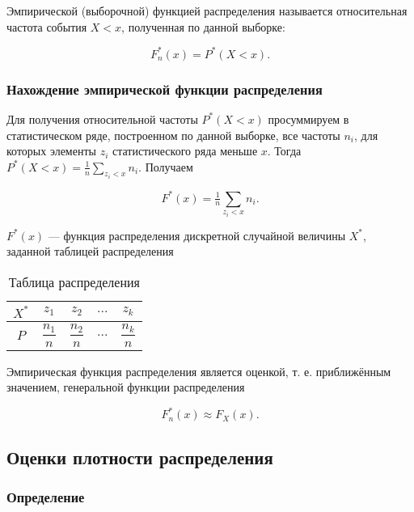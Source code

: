Эмпирической (выборочной) функцией распределения называется относительная частота события $X < x$, полученная по данной выборке:

\begin{equation}
	F_n^*(x) = P^*(X < x).
\end{equation}

\subsubsection{Нахождение эмпирической функции распределения}

Для получения относительной частоты $P^*(X < x)$ просуммируем в статистическом ряде, построенном по данной выборке, все частоты $n_i$, для которых элементы $z_i$ статистического ряда меньше $x$. Тогда $P^*(X < x) = \tfrac{1}{n}\sum\limits_{z_i < x}n_i$. Получаем

\begin{equation}
	F^*(x) = \tfrac{1}{n}\sum\limits_{z_i < x}n_i.
\end{equation}

$F^*(x)$ --- функция распределения дискретной случайной величины $X^*$, заданной таблицей распределения

\begin{table}[h!]
	\begin{center}
		\begin{tabular}{|c|c|c|c|c|}
			\hline
			$X^*$ & $z_1$ & $z_2$ & $...$ & $z_k$ \\
			\hline
			$P$ & $\dfrac{n_1}{n}$ & $\dfrac{n_2}{n}$ & $...$ & $\dfrac{n_k}{n}$ \\
			\hline
		\end{tabular}
	\end{center}
	\caption{Таблица распределения}
\end{table}

Эмпирическая функция распределения является оценкой, т. е. приближённым значением, генеральной функции распределения

\begin{equation}
	F_n^*(x) \approx F_X(x).
\end{equation}

\subsection{Оценки плотности распределения}

\subsubsection{Определение}

